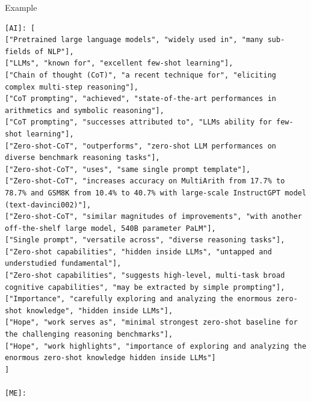\documentclass[aspectratio=1610,xcolor={dvipsnames},hyperref={colorlinks,unicode,linkcolor=violet,anchorcolor=BlueViolet,citecolor=YellowOrange,filecolor=black,urlcolor=Aquamarine}]{beamer}
\begin{document}
\begin{frame}{Example}
\begin{verbatim}
[AI]: [
["Pretrained large language models", "widely used in", "many sub-fields of NLP"],
["LLMs", "known for", "excellent few-shot learning"],
["Chain of thought (CoT)", "a recent technique for", "eliciting complex multi-step reasoning"],
["CoT prompting", "achieved", "state-of-the-art performances in arithmetics and symbolic reasoning"],
["CoT prompting", "successes attributed to", "LLMs ability for few-shot learning"],
["Zero-shot-CoT", "outperforms", "zero-shot LLM performances on diverse benchmark reasoning tasks"],
["Zero-shot-CoT", "uses", "same single prompt template"],
["Zero-shot-CoT", "increases accuracy on MultiArith from 17.7% to 78.7% and GSM8K from 10.4% to 40.7% with large-scale InstructGPT model (text-davinci002)"],
["Zero-shot-CoT", "similar magnitudes of improvements", "with another off-the-shelf large model, 540B parameter PaLM"],
["Single prompt", "versatile across", "diverse reasoning tasks"],
["Zero-shot capabilities", "hidden inside LLMs", "untapped and understudied fundamental"],
["Zero-shot capabilities", "suggests high-level, multi-task broad cognitive capabilities", "may be extracted by simple prompting"],
["Importance", "carefully exploring and analyzing the enormous zero-shot knowledge", "hidden inside LLMs"],
["Hope", "work serves as", "minimal strongest zero-shot baseline for the challenging reasoning benchmarks"],
["Hope", "work highlights", "importance of exploring and analyzing the enormous zero-shot knowledge hidden inside LLMs"]
]

[ME]:
\end{verbatim}
\end{frame}
\end{document}
